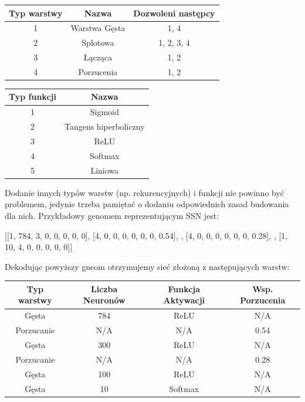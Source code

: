 \documentclass{article}
\begin{document}
\begin{center}
\begin{tabular}{|c|c|c|}
	\hline
	Typ warstwy & Nazwa & Dozwoleni następcy \\
	\hline
	1 & Warstwa Gęsta & 1, 4\\
	2 & Splotowa & 1, 2, 3, 4\\
	3 & Łącząca & 1, 2\\
	4 & Porzucenia & 1, 2 \\
	\hline
\end{tabular}
\label{tab:rules}
\end{center}
\begin{center}
\begin{tabular}{|c|c|}
	\hline
	Typ funkcji & Nazwa\\
	\hline
	1 & Sigmoid \\
	2 & Tangens hiperboliczny \\
	3 & ReLU \\
	4 & Softmax \\
	5 & Liniowa \\
	\hline
\end{tabular}
\end{center}

Dodanie innych typów warstw (np. rekurencyjnych) i funkcji nie powinno być problemem, jedynie
trzeba pamiętać o dodaniu odpowiednich zasad budowania dla nich.
Przykładowy genomem reprezentującym SSN jest:\\
\begin{center}

	$\big[$[1, 784, 3, 0, 0, 0, 0, 0], [4, 0, 0, 0, 0, 0, 0, 0.54], 
	\newline 
	\quad [1, 300, 3, 0, 0, 0, 0, 0], [4, 0, 0, 0, 0, 0, 0, 0.28], 
	\newline 
	[1, 100, 3, 0, 0, 0, 0, 0], [1, 10, 4, 0, 0, 0, 0, 0]$\big]$
	\newline

\end{center}
Dekodując powyższy gneom otrzymujemy sieć złożoną z następujących warstw:\\
\begin{center}
\begin{tabular}{|c|c|c|c|}
	\hline
	Typ warstwy & Liczba Neuronów & Funkcja Aktywacji & Wsp. Porzucenia \\
	\hline
	Gęsta & 784 & ReLU & N/A \\
	Porzucanie & N/A & N/A & 0.54\\
	Gęsta & 300 & ReLU & N/A \\
	Porzucanie & N/A & N/A & 0.28\\
	Gęsta & 100 & ReLU & N/A \\
	Gęsta & 10 & Softmax & N/A \\
	\hline
\end{tabular}
\end{center}
\end{document}

